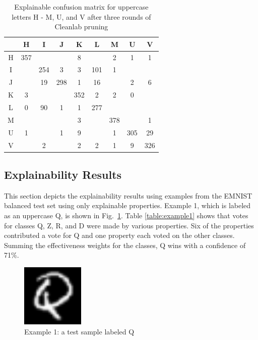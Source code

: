 \documentclass[conference]{IEEEtran}
\begin{document}
\begin{table}
    \centering
    \begin{tabular}{ |c|c|c|c|c|c|c|c|c|}
    \hline
    ~ & H & I & J & K & L & M & U & V \\
    \hline
    H & 357 & &  & 8 & & 2 & 1 & 1 \\
    \hline
    I &  & 254 & 3 & 3 & 101 & 1 & & \\
    \hline
    J & & 19 & 298 & 1 & 16 & & 2 & 6 \\
    \hline
    K & 3 &  &  & 352 & 2 & 2 & 0 & \\
    \hline
    L & 0 & 90 & 1 & 1 & 277 & & & \\
    \hline
    M & & & & 3 & & 378 & & 1 \\
    \hline
    U & 1 & & 1 & 9 & & 1 & 305 & 29 \\
    \hline
    V & & 2 & & 2 & 2 & 1 & 9 & 326 \\
    \hline
    \end{tabular}
    \caption{\label{raw_cap_cleanlab_third_confusion_matrix}Explainable confusion matrix for
    uppercase letters H - M, U, and V after three rounds of Cleanlab pruning}
\end{table}


\subsection{Explainability Results}


This section depicts the explainability results using examples from the EMNIST
balanced test set using only explainable properties.  Example 1, which is labeled as an uppercase Q, is shown in
Fig.~\ref{fig:ex1}.  Table \ref{table:example1} shows that votes for classes Q,
Z, R, and D were made by various properties.  Six of the properties contributed
a vote for Q and one property each voted on the other classes.  Summing the
effectiveness weights for the classes, Q wins with a confidence of 71\%.

\begin{figure}
    \centering
    \includegraphics[width=3cm]{./images/examples/test-Q-0.png}
    \caption{Example 1: a test sample labeled Q}
    \label{fig:ex1}
\end{figure}
\end{document}
